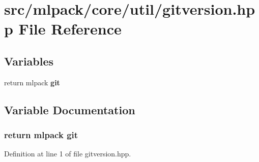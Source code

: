 \section{src/mlpack/core/util/gitversion.hpp File Reference}
\label{gitversion_8hpp}
\subsection*{Variables}
\begin{DoxyCompactItemize}
\item 
return mlpack {\bf git}
\end{DoxyCompactItemize}


\subsection{Variable Documentation}
\subsubsection[{git}]{\setlength{\rightskip}{0pt plus 5cm}return mlpack git}\label{gitversion_8hpp_aaca1455e845db62f07e71d1a49fb32e6}


Definition at line 1 of file gitversion.\+hpp.

